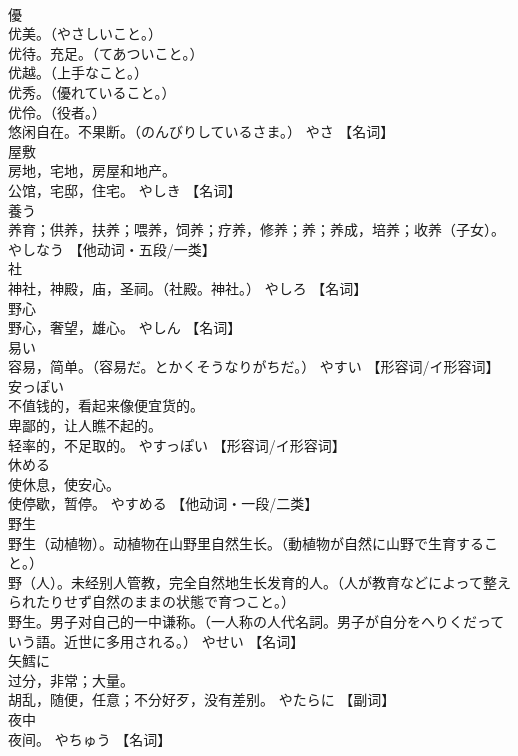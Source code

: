 \documentclass[8pt]{extreport}
\begin{document}
\begin{CJK}{UTF8}{min}
\\	優	
\\	优美。（やさしいこと。） 
\\	优待。充足。（てあついこと。） 
\\	优越。（上手なこと。） 
\\	优秀。（優れていること。） 
\\	优伶。（役者。） 
\\	悠闲自在。不果断。（のんびりしているさま。）	やさ		【名词】
\\	屋敷	
\\	房地，宅地，房屋和地产。 
\\	公馆，宅邸，住宅。	やしき		【名词】
\\	養う	
\\	养育；供养，扶养；喂养，饲养；疗养，修养；养；养成，培养；收养（子女）。	やしなう		【他动词・五段/一类】
\\	社	
\\	神社，神殿，庙，圣祠。（社殿。神社。）	やしろ		【名词】
\\	野心	
\\	野心，奢望，雄心。	やしん		【名词】
\\	易い	
\\	容易，简单。（容易だ。とかくそうなりがちだ。）	やすい		【形容词/イ形容词】
\\	安っぽい	
\\	不值钱的，看起来像便宜货的。 
\\	卑鄙的，让人瞧不起的。 
\\	轻率的，不足取的。	やすっぽい		【形容词/イ形容词】
\\	休める	
\\	使休息，使安心。 
\\	使停歇，暂停。	やすめる		【他动词・一段/二类】
\\	野生	
\\	野生（动植物）。动植物在山野里自然生长。（動植物が自然に山野で生育すること。） 
\\	野（人）。未经别人管教，完全自然地生长发育的人。（人が教育などによって整えられたりせず自然のままの状態で育つこと。） 
\\	野生。男子对自己的一中谦称。（一人称の人代名詞。男子が自分をへりくだっていう語。近世に多用される。）	やせい		【名词】
\\	矢鱈に	
\\	过分，非常；大量。 
\\	胡乱，随便，任意；不分好歹，没有差别。	やたらに		【副词】
\\	夜中	
\\	夜间。	やちゅう		【名词】

\end{CJK}
\end{document}
